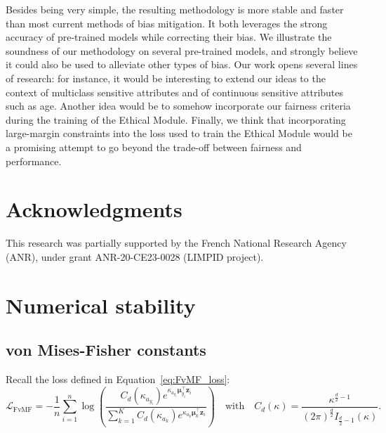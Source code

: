 \documentclass[nohyperref]{article}
\theoremstyle{plain}
\theoremstyle{definition}
\theoremstyle{remark}
\newcommand{\vect}[1]{{\bm{#1}}}
\begin{document}
Besides being very simple, the resulting methodology is more stable and faster than most current methods of bias mitigation. It both leverages the strong accuracy of pre-trained models while correcting their bias. We illustrate the soundness of our methodology on several pre-trained models, and strongly believe it could also be used to alleviate other types of bias. Our work opens several lines of research: for instance, it would be interesting to extend our ideas to the context of multiclass sensitive attributes and of continuous sensitive attributes such as age. Another idea would be to somehow incorporate our fairness criteria during the training of the Ethical Module. Finally, we think that incorporating large-margin constraints into the loss used to train the Ethical Module would be a promising attempt to go beyond the trade-off between fairness and performance.


















 
\section*{Acknowledgments}
This research was partially supported by the French National Research Agency (ANR), under grant ANR-20-CE23-0028 (LIMPID project).







\newpage
\appendix
\onecolumn

\section{Numerical stability}\label{app:numerical_stability}

\subsection{von Mises-Fisher constants}\label{app:vMF_constants}

Recall the loss defined in Equation~\ref{eq:FvMF_loss}:
\begin{equation*} 
\mathcal{L}_{\text{FvMF}} = -\frac{1}{n} \sum\limits_{i=1}^n \log \left( \frac{C_d(\kappa_{a_{y_i}}) e^{ \kappa_{a_{y_i}}  \vect{\mu}_{y_i}^\intercal \vect{z}_i}}{ \sum_{k=1}^K  C_d(\kappa_{a_k}) e^{ \kappa_{a_k} \vect{\mu}_k^\intercal \vect{z}_i} } \right) \quad \text{with} \quad C_d(\kappa) = \frac{\kappa^{\frac{d}{2} - 1}}{(2 \pi)^{\frac{d}{2}} I_{\frac{d}{2} - 1}(\kappa) }.
\end{equation*}
\end{document}
